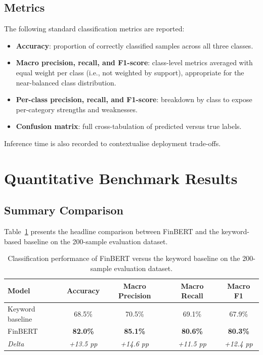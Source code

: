 \subsection{Metrics}

The following standard classification metrics are reported:
\begin{itemize}
    \item \textbf{Accuracy}: proportion of correctly classified samples across all three classes.
    \item \textbf{Macro precision, recall, and F1-score}: class-level metrics averaged with equal weight per class (i.e., not weighted by support), appropriate for the near-balanced class distribution.
    \item \textbf{Per-class precision, recall, and F1-score}: breakdown by class to expose per-category strengths and weaknesses.
    \item \textbf{Confusion matrix}: full cross-tabulation of predicted versus true labels.
\end{itemize}

Inference time is also recorded to contextualise deployment trade-offs.

\section{Quantitative Benchmark Results}
\label{sec:quant_results}

\subsection{Summary Comparison}

Table~\ref{tab:benchmark_summary} presents the headline comparison between FinBERT and the keyword-based baseline on the 200-sample evaluation dataset.

\begin{table}[H]
  \centering
  \caption{Classification performance of FinBERT versus the keyword baseline on the 200-sample evaluation dataset.}
  \label{tab:benchmark_summary}
  \begin{tabular}{@{}lcccc@{}}
    \toprule
    \textbf{Model} & \textbf{Accuracy} & \textbf{Macro Precision} & \textbf{Macro Recall} & \textbf{Macro F1} \\
    \midrule
    Keyword baseline & 68.5\% & 70.5\% & 69.1\% & 67.9\% \\
    FinBERT & \textbf{82.0\%} & \textbf{85.1\%} & \textbf{80.6\%} & \textbf{80.3\%} \\
    \midrule
    \textit{Delta} & \textit{+13.5 pp} & \textit{+14.6 pp} & \textit{+11.5 pp} & \textit{+12.4 pp} \\
    \bottomrule
  \end{tabular}
\end{table}

